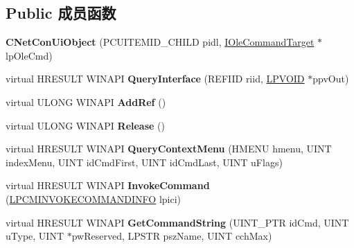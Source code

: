 \subsection*{Public 成员函数}
\begin{DoxyCompactItemize}
\item 
\mbox{\label{class_c_net_con_ui_object_ad4e82c0ada2df6d3ce8e439ee49d815e}} 
{\bfseries C\+Net\+Con\+Ui\+Object} (P\+C\+U\+I\+T\+E\+M\+I\+D\+\_\+\+C\+H\+I\+LD pidl, \hyperlink{interface_i_ole_command_target}{I\+Ole\+Command\+Target} $\ast$lp\+Ole\+Cmd)
\item 
\mbox{\label{class_c_net_con_ui_object_a5afc9328683a4d5baf706530c062c62c}} 
virtual H\+R\+E\+S\+U\+LT W\+I\+N\+A\+PI {\bfseries Query\+Interface} (R\+E\+F\+I\+ID riid, \hyperlink{interfacevoid}{L\+P\+V\+O\+ID} $\ast$ppv\+Out)
\item 
\mbox{\label{class_c_net_con_ui_object_acc0a415953e5895084617d821c76199f}} 
virtual U\+L\+O\+NG W\+I\+N\+A\+PI {\bfseries Add\+Ref} ()
\item 
\mbox{\label{class_c_net_con_ui_object_afcae3af9adac39881b2bd8fff3893b7f}} 
virtual U\+L\+O\+NG W\+I\+N\+A\+PI {\bfseries Release} ()
\item 
\mbox{\label{class_c_net_con_ui_object_a2f58a08c9a756efb81b2573990311ee4}} 
virtual H\+R\+E\+S\+U\+LT W\+I\+N\+A\+PI {\bfseries Query\+Context\+Menu} (H\+M\+E\+NU hmenu, U\+I\+NT index\+Menu, U\+I\+NT id\+Cmd\+First, U\+I\+NT id\+Cmd\+Last, U\+I\+NT u\+Flags)
\item 
\mbox{\label{class_c_net_con_ui_object_ae96a908c4e73eb29b911825491e68b05}} 
virtual H\+R\+E\+S\+U\+LT W\+I\+N\+A\+PI {\bfseries Invoke\+Command} (\hyperlink{struct_i_context_menu_1_1tag_c_m_i_n_v_o_k_e_c_o_m_m_a_n_d_i_n_f_o}{L\+P\+C\+M\+I\+N\+V\+O\+K\+E\+C\+O\+M\+M\+A\+N\+D\+I\+N\+FO} lpici)
\item 
\mbox{\label{class_c_net_con_ui_object_ac7b172a60ad096c91ef896ffa3590d1c}} 
virtual H\+R\+E\+S\+U\+LT W\+I\+N\+A\+PI {\bfseries Get\+Command\+String} (U\+I\+N\+T\+\_\+\+P\+TR id\+Cmd, U\+I\+NT u\+Type, U\+I\+NT $\ast$pw\+Reserved, L\+P\+S\+TR psz\+Name, U\+I\+NT cch\+Max)

\end{DoxyCompactItemize}
